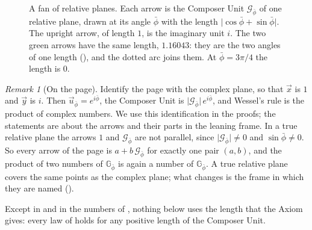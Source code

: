 \documentclass[11pt,a4paper]{amsart}
\theoremstyle{plain}
\theoremstyle{definition}
\theoremstyle{remark}
\newtheorem{remark}[theorem]{Remark}
\newcommand{\pb}{\bar{\phi}}                     %
\newcommand{\Gp}{\mathcal{G}_{\bar{\phi}}}       %
\newcommand{\up}{\vec{u}_{\bar{\phi}}}           %
\newcommand{\GNp}{\mathbb{G}_{\bar{\phi}}}       %
\begin{document}
\begin{figure}[tb]
\centering
{}
\caption{A fan of relative planes. Each arrow is the Composer Unit $\Gp$ of one relative plane, drawn at its angle $\pb$ with the length $\lvert\cos\pb + \sin\pb\rvert$. The upright arrow, of length $1$, is the imaginary unit $i$. The two green arrows have the same length, $1.16043$: they are the two angles of one length (), and the dotted arc joins them. At $\pb = 3\pi/4$ the length is $0$.}
\label{fig:fan}
\end{figure}

\begin{remark}[On the page]\label{rem:page}
Identify the page with the complex plane, so that $\vec{x}$ is $1$ and $\vec{y}$ is $i$. Then $\up = e^{i\pb}$, the Composer Unit is $\lvert\Gp\rvert\,e^{i\pb}$, and Wessel's rule is the product of complex numbers. We use this identification in the proofs; the statements are about the arrows and their parts in the leaning frame. In a true relative plane the arrows $1$ and $\Gp$ are not parallel, since $\lvert\Gp\rvert \neq 0$ and $\sin\pb \neq 0$. So every arrow of the page is $a + b\,\Gp$ for exactly one pair $(a, b)$, and the product of two numbers of $\GNp$ is again a number of $\GNp$. A true relative plane covers the same points as the complex plane; what changes is the frame in which they are named ().
\end{remark}

Except in  and in the numbers of , nothing below uses the length that the Axiom gives: every law of  holds for any positive length of the Composer Unit.
\end{document}
